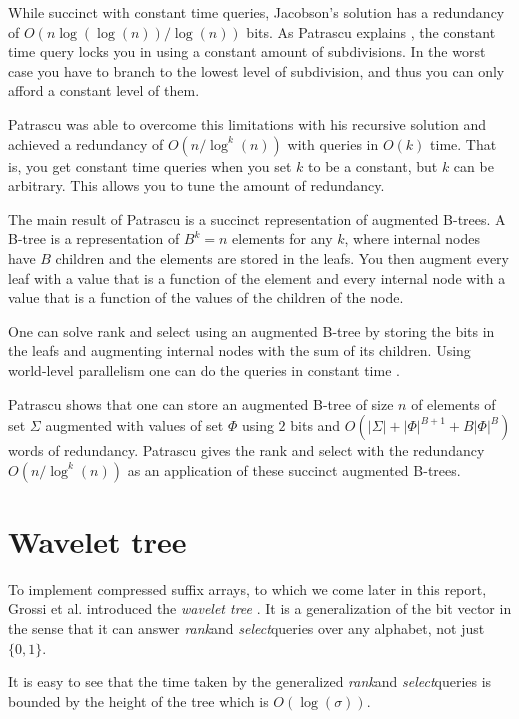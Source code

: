 \documentclass[11pt]{article}
\newcommand{\bigo}{O}
\newcommand{\rank}{\textit{rank}}
\newcommand{\select}{\textit{select}}
\begin{document}
While succinct with constant time queries, Jacobson's solution has a
redundancy of $\bigo(n \log(\log(n)) / \log(n))$ bits. As Patrascu
explains \cite{patrascu08}, the constant time query locks you in using
a constant amount of subdivisions. In the worst case you have to
branch to the lowest level of subdivision, and thus you can only
afford a constant level of them.

Patrascu was able to overcome this limitations with his recursive
solution \cite{patrascu08} and achieved a redundancy of $\bigo(n /
\log^k(n))$ with queries in $\bigo(k)$ time. That is, you get constant
time queries when you set $k$ to be a constant, but $k$ can be
arbitrary. This allows you to tune the amount of redundancy.

The main result of Patrascu is a succinct representation of
augmented B-trees. A B-tree is a representation of $B^k = n$ elements
for any $k$, where internal nodes have $B$ children and the elements
are stored in the leafs. You then augment every leaf with a value that
is a function of the element and every internal node with a value that
is a function of the values of the children of the node.

One can solve rank and select using an augmented B-tree
\cite{patrascu08} by storing the bits in the leafs and augmenting
internal nodes with the sum of its children. Using world-level
parallelism one can do the queries in constant time \cite{patrascu08}.

Patrascu shows \cite{patrascu08} that one can store an augmented
B-tree of size $n$ of elements of set $\Sigma$ augmented with values
of set $\Phi$ using $2$ bits and $\bigo(|\Sigma| + |\Phi|^{B+1} +
B|\Phi|^B)$ words of redundancy. Patrascu gives the rank and select
with the redundancy $\bigo(n / \log^k(n))$ as an application of these
succinct augmented B-trees.

\section{Wavelet tree}

To implement compressed suffix arrays, to which we come later in this
report, Grossi et al. introduced the \emph{wavelet tree}
\cite{grossi03}. It is a generalization of the bit vector in the sense
that it can answer \rank and \select queries over any alphabet, not
just $\{0, 1\}$.

It is easy to see that the time taken by the generalized \rank and
\select queries is bounded by the height of the tree which is
$\bigo(\log(\sigma))$.
\end{document}
